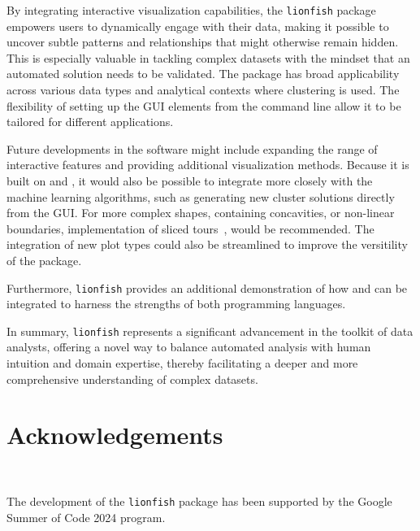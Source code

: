 \documentclass[article]{ajs}
\begin{document}
By integrating interactive visualization capabilities, the \texttt{lionfish} package empowers users to dynamically engage with their data, making it possible to uncover subtle patterns and relationships that might otherwise remain hidden. This is especially valuable in tackling complex datasets with the mindset that an automated solution needs to be validated. The package has broad applicability across various data types and analytical contexts where clustering is used. The flexibility of setting up the GUI elements from the command line allow it to be tailored for different applications.

Future developments in the software might include expanding the range of interactive features and providing additional visualization methods. Because it is built on  and , it would also be possible to integrate more closely with the machine learning algorithms, such as generating new cluster solutions directly from the GUI. For more complex shapes, containing concavities, or non-linear boundaries, implementation of sliced tours~\citep{Laa2020}, would be recommended. The integration of new plot types could also be streamlined to improve the versitility of the package.

Furthermore, \texttt{lionfish} provides an additional demonstration of how  and  can be integrated to harness the strengths of both programming languages.

In summary, \texttt{lionfish} represents a significant advancement in the toolkit of data analysts, offering a novel way to balance automated analysis with human intuition and domain expertise, thereby facilitating a deeper and more comprehensive understanding of complex datasets.

\section{Acknowledgements}~\label{acknowledgements}

The development of the \texttt{lionfish} package has been supported by the Google Summer of Code 2024 program.

%

\end{document}
